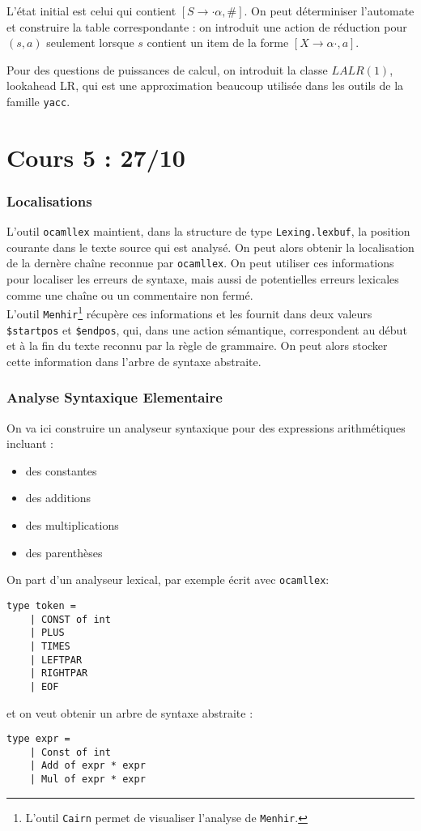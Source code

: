 \documentclass{cours}
\begin{document}
L'état initial est celui qui contient $\left[S \rightarrow \cdot \alpha, \#\right]$. On peut déterminiser l'automate et construire la table correspondante : on introduit une action de réduction pour $(s, a)$ seulement lorsque $s$ contient un item de la forme $\left[X \rightarrow \alpha\cdot, a\right]$.

Pour des questions de puissances de calcul, on introduit la classe $LALR(1)$, lookahead LR, qui est une approximation beaucoup utilisée dans les outils de la famille \texttt{yacc}.

\newpage
\part[Analyse Syntaxique 2]{Cours 5 : 27/10}
\localtableofcontents
\section{Localisations}
L'outil \texttt{ocamllex} maintient, dans la structure de type \texttt{Lexing.lexbuf}, la position courante dans le texte source qui est analysé. On peut alors obtenir la localisation de la dernère chaîne reconnue par \texttt{ocamllex}. On peut utiliser ces informations pour localiser les erreurs de syntaxe, mais aussi de potentielles erreurs lexicales comme une chaîne ou un commentaire non fermé.\\
L'outil \texttt{Menhir}\footnote{L'outil \texttt{Cairn} permet de visualiser l'analyse de \texttt{Menhir}.} récupère ces informations et les fournit dans deux valeurs \texttt{\$startpos} et \texttt{\$endpos}, qui, dans une action sémantique, correspondent au début et à la fin du texte reconnu par la règle de grammaire. On peut alors stocker cette information dans l'arbre de syntaxe abstraite.

\section{Analyse Syntaxique Elementaire}
On va ici construire un analyseur syntaxique pour des expressions arithmétiques incluant :
\begin{itemize}
    \item des constantes
    \item des additions
    \item des multiplications
    \item des parenthèses
\end{itemize}
On part d'un analyseur lexical, par exemple écrit avec \texttt{ocamllex}:
\begin{verbatim}
type token = 
    | CONST of int
    | PLUS
    | TIMES
    | LEFTPAR
    | RIGHTPAR
    | EOF
\end{verbatim}
et on veut obtenir un arbre de syntaxe abstraite :
\begin{verbatim}
type expr = 
    | Const of int
    | Add of expr * expr
    | Mul of expr * expr
\end{verbatim}
\end{document}
